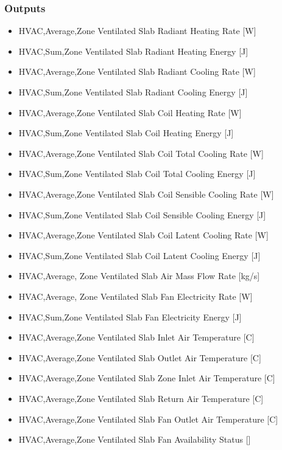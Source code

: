 \subsubsection{Outputs}\label{outputs-9-006}

\begin{itemize}
\item
  HVAC,Average,Zone Ventilated Slab Radiant Heating Rate {[}W{]}
\item
  HVAC,Sum,Zone Ventilated Slab Radiant Heating Energy {[}J{]}
\item
  HVAC,Average,Zone Ventilated Slab Radiant Cooling Rate {[}W{]}
\item
  HVAC,Sum,Zone Ventilated Slab Radiant Cooling Energy {[}J{]}
\item
  HVAC,Average,Zone Ventilated Slab Coil Heating Rate {[}W{]}
\item
  HVAC,Sum,Zone Ventilated Slab Coil Heating Energy {[}J{]}
\item
  HVAC,Average,Zone Ventilated Slab Coil Total Cooling Rate {[}W{]}
\item
  HVAC,Sum,Zone Ventilated Slab Coil Total Cooling Energy {[}J{]}
\item
  HVAC,Average,Zone Ventilated Slab Coil Sensible Cooling Rate {[}W{]}
\item
  HVAC,Sum,Zone Ventilated Slab Coil Sensible Cooling Energy {[}J{]}
\item
  HVAC,Average,Zone Ventilated Slab Coil Latent Cooling Rate {[}W{]}
\item
  HVAC,Sum,Zone Ventilated Slab Coil Latent Cooling Energy {[}J{]}
\item
  HVAC,Average, Zone Ventilated Slab Air Mass Flow Rate {[}kg/s{]}
\item
  HVAC,Average, Zone Ventilated Slab Fan Electricity Rate {[}W{]}
\item
  HVAC,Sum,Zone Ventilated Slab Fan Electricity Energy {[}J{]}
\item
  HVAC,Average,Zone Ventilated Slab Inlet Air Temperature {[}C{]}
\item
  HVAC,Average,Zone Ventilated Slab Outlet Air Temperature {[}C{]}
\item
  HVAC,Average,Zone Ventilated Slab Zone Inlet Air Temperature {[}C{]}
\item
  HVAC,Average,Zone Ventilated Slab Return Air Temperature {[}C{]}
\item
  HVAC,Average,Zone Ventilated Slab Fan Outlet Air Temperature {[}C{]}
\item
  HVAC,Average,Zone Ventilated Slab Fan Availability Status {[]}
\end{itemize}

